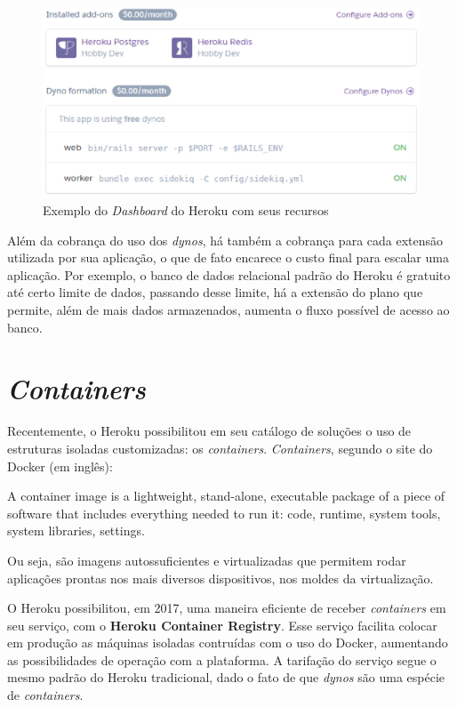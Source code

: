 \begin{figure}[h!]
  \centering
  \includegraphics[scale=0.75]{imagens/heroku_dashboard.eps}
  \caption{Exemplo do \textit{Dashboard} do Heroku com seus recursos}
\end{figure}

Além da cobrança do uso dos \textit{dynos}, há também a cobrança para cada extensão utilizada por sua aplicação, o que de fato encarece o custo final para escalar uma aplicação. Por exemplo, o banco de dados relacional padrão do Heroku é gratuito até certo limite de dados, passando desse limite, há a extensão do plano que permite, além de mais dados armazenados, aumenta o fluxo possível de acesso ao banco.

\section{\textit{Containers}}

Recentemente, o Heroku possibilitou em seu catálogo de soluções o uso de estruturas isoladas customizadas: os \textit{containers}. \textit{Containers}, segundo o site do Docker\cite{dockercontainer} (em inglês):

\begin{citacaoLonga}
  A container image is a lightweight, stand-alone, executable package of a piece of software that includes everything needed to run it: code, runtime, system tools, system libraries, settings.
\end{citacaoLonga}

Ou seja, são imagens autossuficientes e virtualizadas que permitem rodar aplicações prontas nos mais diversos dispositivos, nos moldes da virtualização.

O Heroku possibilitou, em 2017, uma maneira eficiente de receber \textit{containers} em seu serviço, com o \textbf{Heroku Container Registry}\cite{herokucontainerregistry}. Esse serviço facilita colocar em produção as máquinas isoladas contruídas com o uso do Docker, aumentando as possibilidades de operação com a plataforma. A tarifação do serviço segue o mesmo padrão do Heroku tradicional, dado o fato de que \textit{dynos} são uma espécie de \textit{containers}.

